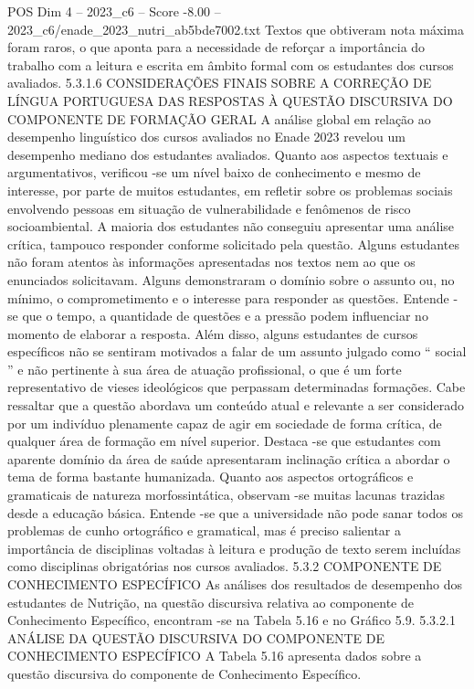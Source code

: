 \begin{textsample}{POS Dim 4 – 2023\_c6 – Score -8.00 – 2023\_c6/enade\_2023\_nutri\_ab5bde7002.txt}
Textos que obtiveram nota máxima foram raros, o que aponta para a necessidade de reforçar a importância do trabalho com a leitura e escrita em âmbito formal com os estudantes dos cursos avaliados. 5.3.1.6 CONSIDERAÇÕES FINAIS SOBRE A CORREÇÃO DE LÍNGUA PORTUGUESA DAS RESPOSTAS À QUESTÃO DISCURSIVA DO COMPONENTE DE FORMAÇÃO GERAL A análise global em relação ao desempenho linguístico dos cursos avaliados no Enade 2023 revelou um desempenho mediano dos estudantes avaliados.
Quanto aos aspectos textuais e argumentativos, verificou -se um nível baixo de conhecimento e mesmo de interesse, por parte de muitos estudantes, em refletir sobre os problemas sociais envolvendo pessoas em situação de vulnerabilidade e fenômenos de risco socioambiental.
A maioria dos estudantes não conseguiu apresentar uma análise crítica, tampouco responder conforme solicitado pela questão.
Alguns estudantes não foram atentos às informações apresentadas nos textos nem ao que os enunciados solicitavam.
Alguns demonstraram o domínio sobre o assunto ou, no mínimo, o comprometimento e o interesse para responder as questões.
Entende -se que o tempo, a quantidade de questões e a pressão podem influenciar no momento de elaborar a resposta.
Além disso, alguns estudantes de cursos específicos não se sentiram motivados a falar de um assunto julgado como “ social ” e não pertinente à sua área de atuação profissional, o que é um forte representativo de vieses ideológicos que perpassam determinadas formações.
Cabe ressaltar que a questão abordava um conteúdo atual e relevante a ser considerado por um indivíduo plenamente capaz de agir em sociedade de forma crítica, de qualquer área de formação em nível superior.
Destaca -se que estudantes com aparente domínio da área de saúde apresentaram inclinação crítica a abordar o tema de forma bastante humanizada.
Quanto aos aspectos ortográficos e gramaticais de natureza morfossintática, observam -se muitas lacunas trazidas desde a educação básica.
Entende -se que a universidade não pode sanar todos os problemas de cunho ortográfico e gramatical, mas é preciso salientar a importância de disciplinas voltadas à leitura e produção de texto serem incluídas como disciplinas obrigatórias nos cursos avaliados. 5.3.2 COMPONENTE DE CONHECIMENTO ESPECÍFICO As análises dos resultados de desempenho dos estudantes de Nutrição, na questão discursiva relativa ao componente de Conhecimento Específico, encontram -se na Tabela 5.16 e no Gráfico 5.9. 5.3.2.1 ANÁLISE DA QUESTÃO DISCURSIVA DO COMPONENTE DE CONHECIMENTO ESPECÍFICO A Tabela 5.16 apresenta dados sobre a questão discursiva do componente de Conhecimento Específico.

\end{textsample}
